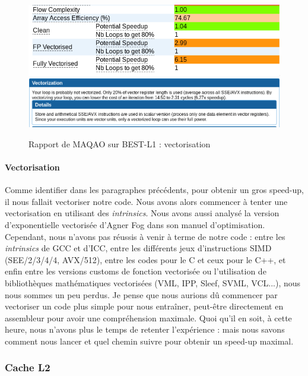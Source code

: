 \documentclass[12pt,a4paper]{article}
\begin{document}
\begin{figure}[ht]
    \centering
    \includegraphics[scale=0.6]{figures/L1/maqao_bestl1_wflags.png}
    \includegraphics[scale=0.45]{figures/L1/maqao_bestl1_wflags_vec.png}
    \caption{Rapport de MAQAO sur BEST-L1 : vectorisation}
    \label{fig.maqao_bestl1_vec}
\end{figure}

\paragraph{Vectorisation} Comme identifier dans les paragraphes précédents, pour
obtenir un gros speed-up, il nous fallait vectoriser notre code. Nous avons
alors commencer à tenter une vectorisation en utilisant des \textit{intrinsics}.
Nous avons aussi analysé la version d'exponentielle vectorisée d'Agner Fog dans
son manuel d'optimisation. Cependant, nous n'avons pas réussis à venir à terme
de notre code : entre les \textit{intrinsics} de GCC et d'ICC, entre les
différents jeux d'instructions SIMD (SEE/2/3/4/4, AVX/512), entre les codes
pour le C et ceux pour le C++, et enfin entre les versions customs de fonction
vectorisée ou l'utilisation de bibliothèques mathématiques vectorisées (VML, IPP,
Sleef, SVML, VCL...), nous nous sommes un peu perdus. Je pense que nous aurions
dû commencer par vectoriser un code plus simple pour nous entraîner, peut-être
directement en assembleur pour avoir une compréhension maximale. Quoi qu'il en
soit, à cette heure, nous n'avons plus le temps de retenter l'expérience : mais
nous savons comment nous lancer et quel chemin suivre pour obtenir un speed-up
maximal.

\subsubsection{Cache L2}
\end{document}
